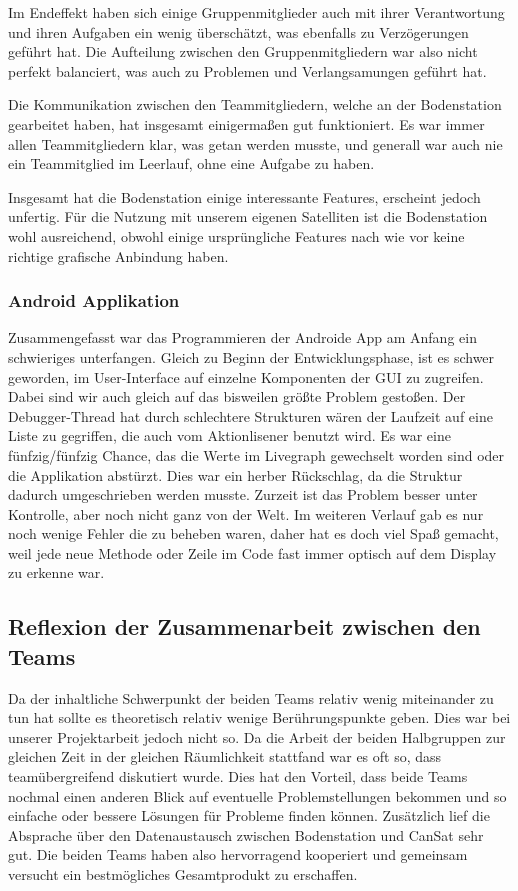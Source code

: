 Im Endeffekt haben sich einige Gruppenmitglieder auch mit ihrer Verantwortung und ihren Aufgaben ein wenig überschätzt, was ebenfalls zu Verzögerungen geführt hat. Die Aufteilung zwischen den Gruppenmitgliedern war also nicht perfekt balanciert, was auch zu Problemen und Verlangsamungen geführt hat.

Die Kommunikation zwischen den Teammitgliedern, welche an der Bodenstation gearbeitet haben, hat insgesamt einigermaßen gut funktioniert. Es war immer allen Teammitgliedern klar, was getan werden musste, und generall war auch nie ein Teammitglied im Leerlauf, ohne eine Aufgabe zu haben.

Insgesamt hat die Bodenstation einige interessante Features, erscheint jedoch unfertig. Für die Nutzung mit unserem eigenen Satelliten ist die Bodenstation wohl ausreichend, obwohl einige ursprüngliche Features nach wie vor keine richtige grafische Anbindung haben.

\subsubsection{Android Applikation}
Zusammengefasst war das Programmieren der Androide App am Anfang ein schwieriges unterfangen. Gleich zu Beginn der Entwicklungsphase, ist es schwer geworden, im User-Interface auf einzelne Komponenten der GUI zu zugreifen. Dabei sind wir auch gleich auf das bisweilen größte Problem gestoßen. Der Debugger-Thread hat durch schlechtere Strukturen wären der Laufzeit auf eine Liste zu gegriffen, die auch vom Aktionlisener benutzt wird. Es war eine fünfzig/fünfzig Chance, das die Werte im Livegraph gewechselt worden sind oder die Applikation abstürzt. Dies war ein herber Rückschlag, da die Struktur dadurch umgeschrieben werden musste. Zurzeit ist das Problem besser unter Kontrolle, aber noch nicht ganz von der Welt. Im weiteren Verlauf gab es nur noch wenige Fehler die zu beheben waren, daher hat es doch viel Spaß gemacht, weil jede neue Methode oder Zeile im Code fast immer optisch auf dem Display zu erkenne war. 

\subsection{Reflexion der Zusammenarbeit zwischen den Teams}
Da der inhaltliche Schwerpunkt der beiden Teams relativ wenig miteinander zu tun hat sollte es theoretisch relativ wenige Berührungspunkte geben. Dies war bei unserer Projektarbeit jedoch nicht so. Da die Arbeit der beiden Halbgruppen zur gleichen Zeit in der gleichen Räumlichkeit stattfand war es oft so, dass teamübergreifend  diskutiert wurde. Dies hat den Vorteil, dass beide Teams nochmal einen anderen Blick auf eventuelle Problemstellungen bekommen und so einfache oder bessere Lösungen für Probleme finden können. Zusätzlich lief die Absprache über den Datenaustausch zwischen Bodenstation und CanSat sehr gut. Die beiden Teams haben also hervorragend kooperiert und gemeinsam versucht ein bestmögliches Gesamtprodukt zu erschaffen.
